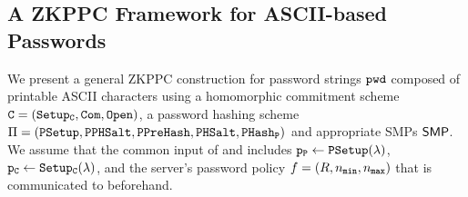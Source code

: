 
\subsection{A ZKPPC Framework for ASCII-based Passwords} \label{sec:genconstruction}
We present a general \ac{ZKPPC} construction for password strings $\mathtt{pwd}$ composed of printable \ac{ASCII} characters using a homomorphic commitment scheme $\mathtt{C}=(\mathtt{Setup_C},\mathtt{Com},\mathtt{Open})$, a password hashing scheme $\Pi=(\mathtt{PSetup},\mathtt{PPHSalt},\allowbreak\mathtt{PPreHash},\allowbreak\mathtt{PHSalt},\allowbreak\mathtt{PHash_P})$ and appropriate \acp{SMP} $\mathsf{SMP}$. 
We assume that the common input of \Client and \Server includes $\mathtt{p_P}\gets\mathtt{PSetup}(\lambda)$, $\mathtt{p_C}\gets\mathtt{Setup_C}(\lambda)$, and the server's password policy $f=(R, {n_\mathtt{min}}, {n_\mathtt{max}})$ that is communicated to \Client beforehand.

